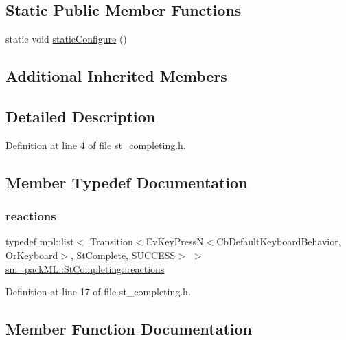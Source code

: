 \subsection*{Static Public Member Functions}
\begin{DoxyCompactItemize}
\item 
static void \hyperlink{structsm__packML_1_1StCompleting_a67bbe8665dd9e951fb6c3c537a984d9b}{static\+Configure} ()
\end{DoxyCompactItemize}
\subsection*{Additional Inherited Members}


\subsection{Detailed Description}


Definition at line 4 of file st\+\_\+completing.\+h.



\subsection{Member Typedef Documentation}
\mbox{\label{structsm__packML_1_1StCompleting_ac7d5fc66e935874dfea9279c6205e0bb}} 
\subsubsection{\texorpdfstring{reactions}{reactions}}
{\footnotesize\ttfamily typedef mpl\+::list$<$ Transition$<$Ev\+Key\+PressN$<$Cb\+Default\+Keyboard\+Behavior, \hyperlink{classsm__packML_1_1OrKeyboard}{Or\+Keyboard}$>$, \hyperlink{structsm__packML_1_1StComplete}{St\+Complete}, \hyperlink{classSUCCESS}{S\+U\+C\+C\+E\+SS}$>$ $>$ \hyperlink{structsm__packML_1_1StCompleting_ac7d5fc66e935874dfea9279c6205e0bb}{sm\+\_\+pack\+M\+L\+::\+St\+Completing\+::reactions}}



Definition at line 17 of file st\+\_\+completing.\+h.



\subsection{Member Function Documentation}
\mbox{\label{structsm__packML_1_1StCompleting_a3d02e214c28fb1b9081aee053c608a8b}} 
